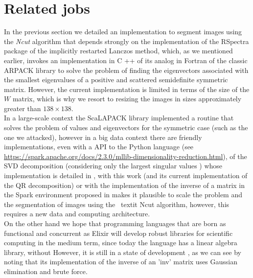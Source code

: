 \documentclass[conference]{IEEEtran}
\theoremstyle{definition}
\begin{document}
\section{Related jobs}
In the previous section we detailed an implementation to segment images using the \textit {Ncut} algorithm that depends strongly on the implementation of the RSpectra \cite {RSpectra} package of the implicitly restarted Lanczos method, which, as we mentioned earlier, invokes an implementation in C ++ of its analog in Fortran of the classic ARPACK \cite {Arpack} library to solve the problem of finding the eigenvectors associated with the smallest eigenvalues of a positive and scattered semidefinite symmetric matrix. However, the current implementation is limited in terms of the size of the $ W $ matrix, which is why we resort to resizing the images in sizes approximately greater than $ 138 \times 138$. \\
In a large-scale context the ScaLAPACK \cite {ScaLAPACK} library implemented a routine that solves the problem of values and eigenvectors for the symmetric case (such as the one we attacked), however in a big data context there are friendly implementations, even with a API to the Python language (see \url {https://spark.apache.org/docs/2.3.0/mllib-dimensionality-reduction.html}), of the SVD decomposition (considering only the largest singular values ) whose implementation is detailed in \cite {MatrixSpark}, with this work (and its current implementation of the QR decomposition) or with the implementation of the inverse of a matrix in the Spark environment proposed in \cite {Sparkbased} makes it plausible to scale the problem and the segmentation of images using the \ textit {Ncut} algorithm, however, this requires a new data and computing architecture. \\
On the other hand we hope that programming languages that are born as functional and concurrent as Elixir \cite{Elixir} will develop robust libraries for scientific computing in the medium term, since today the language has a linear algebra library, without However, it is still in a state of development \cite {ElixirLib}, as we can see by noting that its implementation of the inverse of an 'inv' matrix uses Gaussian elimination and brute force.
\end{document}
